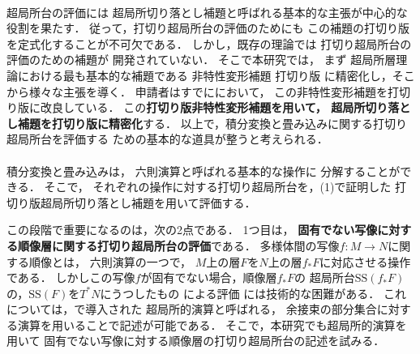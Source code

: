 \documentclass[11pt,a4paper,uplatex,dvipdfmx]{ujarticle} 		%
\newcommand{\研究課題名}{打切り超局所台を用いた層のフーリエ変換の研究とシンプレクティック幾何への応用}
\newcommand{\研究機関名}{北海道大学}
\newcommand{\研究代表者氏名}{大柴寿浩}
\begin{document}
\paragraph*{}
超局所台の評価には
超局所切り落とし補題と呼ばれる基本的な主張が中心的な役割を果たす．
従って，打切り超局所台の評価のためにも
この補題の打切り版を定式化することが不可欠である．
しかし，既存の理論では
打切り超局所台の評価のための補題が
開発されていない．
そこで本研究では，
まず
超局所層理論における最も基本的な補題である
非特性変形補題
打切り版
に精密化し，そこから様々な主張を導く．
申請者はすでに\cite{Osh26}において，
この非特性変形補題を打切り版に改良している．
この\textbf{打切り版非特性変形補題を用いて，
超局所切り落とし補題を打切り版に精密化}する．
以上で，積分変換と畳み込みに関する打切り超局所台を評価する
ための基本的な道具が整うと考えられる．
\vspace{-16pt}
\paragraph*{}
積分変換と畳み込みは，
六則演算と呼ばれる基本的な操作に
分解することができる．
そこで，
それぞれの操作に対する打切り超局所台を，(1)で証明した
打切り版超局所切り落とし補題を用いて評価する．

この段階で重要になるのは，次の2点である．
1つ目は，
\textbf{固有でない写像に対する順像層に関する打切り超局所台の評価}である．
多様体間の写像\(f\colon M\to N\)に関する順像とは，
六則演算の一つで，
\(M\)上の層\(F\)を\(N\)上の層\(f_{\ast}F\)に対応させる操作である．
しかしこの写像\(f\)が固有でない場合，順像層\(f_{\ast}F\)の
超局所台\(\mathrm{SS}(f_{\ast}F)\)の，\(\mathrm{SS}(F)\)を\(T^{\ast}N\)にうつしたもの
による評価
には技術的な困難がある．
これについては，\cite{KS90}で導入された
超局所的演算と呼ばれる，
余接束の部分集合に対する演算を用いることで記述が可能である．
そこで，本研究でも超局所的演算を用いて
固有でない写像に対する順像層の打切り超局所台の記述を試みる．
\end{document}
